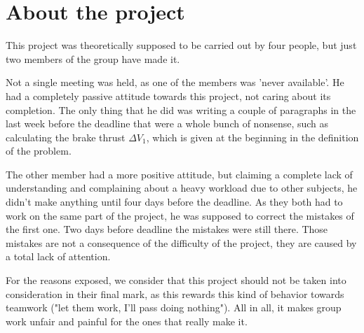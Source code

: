 \section*{About the project}

This project was theoretically supposed to be carried out by four people, but just two members of the group have made it.

Not a single meeting was held, as one of the members was 'never available'. He had a completely passive attitude towards this project, not caring about its completion. The only thing that he did was writing a couple of paragraphs in the last week before the deadline that were a whole bunch of nonsense, such as calculating the brake thrust $\Delta V_1$, which is given at the beginning in the definition of the problem.

The other member had a more positive attitude, but claiming a complete lack of understanding and complaining about a heavy workload due to other subjects, he didn't make anything until four days before the deadline. As they both had to work on the same part of the project, he was supposed to correct the mistakes of the first one. Two days before deadline the mistakes were still there. Those mistakes are not a consequence of the difficulty of the project, they are caused by a total lack of attention.   

For the reasons exposed, we consider that this project should not be taken into consideration in their final mark, as this rewards this kind of behavior towards teamwork ("let them work, I'll pass doing nothing"). All in all, it makes group work unfair and painful for the ones that really make it.